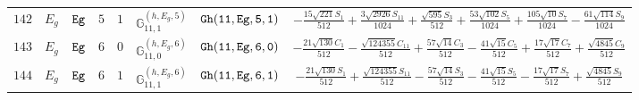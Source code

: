 \documentclass[fleqn,8pt]{jsarticle}
\begin{document}
\begin{table}[ht!]
\begin{center}
\begin{tabular}{cccccccc}
$ 142 $ & $ E_{g} $ & $ {\tt Eg} $ & $ 5 $ & $ 1 $ & $ \mathbb{G}_{11,1}^{(h,E_{g},5)} $ & $ {\tt Gh(11,Eg,5,1)} $ & $ - \frac{15 \sqrt{221} S_{1}}{512} + \frac{3 \sqrt{2926} S_{11}}{1024} + \frac{\sqrt{595} S_{3}}{512} + \frac{53 \sqrt{102} S_{5}}{1024} + \frac{105 \sqrt{10} S_{7}}{1024} - \frac{61 \sqrt{114} S_{9}}{1024} $ \\
$ 143 $ & $ E_{g} $ & $ {\tt Eg} $ & $ 6 $ & $ 0 $ & $ \mathbb{G}_{11,0}^{(h,E_{g},6)} $ & $ {\tt Gh(11,Eg,6,0)} $ & $ - \frac{21 \sqrt{130} C_{1}}{512} - \frac{\sqrt{124355} C_{11}}{512} + \frac{57 \sqrt{14} C_{3}}{512} - \frac{41 \sqrt{15} C_{5}}{512} + \frac{17 \sqrt{17} C_{7}}{512} + \frac{\sqrt{4845} C_{9}}{512} $ \\
$ 144 $ & $ E_{g} $ & $ {\tt Eg} $ & $ 6 $ & $ 1 $ & $ \mathbb{G}_{11,1}^{(h,E_{g},6)} $ & $ {\tt Gh(11,Eg,6,1)} $ & $ - \frac{21 \sqrt{130} S_{1}}{512} + \frac{\sqrt{124355} S_{11}}{512} - \frac{57 \sqrt{14} S_{3}}{512} - \frac{41 \sqrt{15} S_{5}}{512} - \frac{17 \sqrt{17} S_{7}}{512} + \frac{\sqrt{4845} S_{9}}{512} $ \\
 \hline \hline
\end{tabular}
\end{center}
\end{table}
\end{document}
